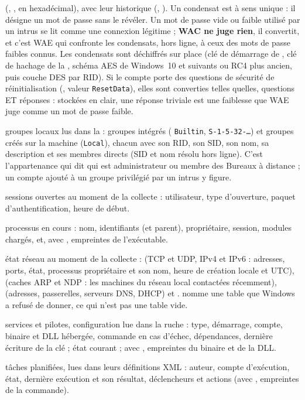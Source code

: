 \documentclass[11pt,a4paper,oneside]{report}
\begin{document}
\begin{description}[style=nextline,leftmargin=1.2em]
        (, , en hexadécimal), avec leur historique
        (, ). Un condensat est à sens
        unique : il désigne un mot de passe sans le révéler. Un mot de passe vide
        ou faible utilisé par un intrus se lit comme une connexion légitime ;
        \textbf{WAC ne juge rien}, il convertit, et c'est WAE qui confronte les
        condensats, hors ligne, à ceux des mots de passe faibles connus. Les
        condensats sont déchiffrés sur place (clé de démarrage de ,
        clé de hachage de la , schéma AES de Windows~10 et suivants
        ou RC4 plus ancien, puis couche DES par RID). Si le compte porte des
        questions de sécurité de réinitialisation (,
        valeur \texttt{ResetData}), elles sont converties telles quelles,
        questions ET réponses : stockées en clair, une réponse triviale est une
        faiblesse que WAE juge comme un mot de passe faible.
  \item[\fichier{local\_groups.json}] groupes locaux lus dans la  :
        groupes intégrés ( \texttt{Builtin}, \texttt{S-1-5-32-…}) et
        groupes créés sur la machine (\texttt{Local}), chacun avec son RID, son
        SID, son nom, sa description et ses membres directs (SID et nom résolu
        hors ligne). C'est l'appartenance qui dit qui est administrateur ou
        membre des Bureaux à distance ; un compte ajouté à un groupe privilégié
        par un intrus y figure.
  \item[\fichier{Sessions.json}] sessions ouvertes au moment de la collecte :
        utilisateur, type d'ouverture, paquet d'authentification, heure de début.
  \item[\fichier{processes.json}] processus en cours : nom, identifiants (et
        parent), propriétaire, session, modules chargés, et, avec ,
        empreintes de l'exécutable.
  \item[\fichier{network.json}] état réseau au moment de la collecte :
         (TCP et UDP, IPv4 et IPv6 : adresses, ports, état,
        processus propriétaire et son nom, heure de création locale et UTC),
         (caches ARP et NDP : les machines du réseau local
        contactées récemment),  (adresses, passerelles,
        serveurs DNS, DHCP) et .  nomme une
        table que Windows a refusé de donner, ce qui n'est pas une table vide.
  \item[\fichier{services.json}] services et pilotes, configuration lue dans la
        ruche : type, démarrage, compte, binaire et DLL hébergée, commande en cas
        d'échec, dépendances, dernière écriture de la clé ; état courant ; avec
        , empreintes du binaire et de la DLL.
  \item[\fichier{ScheduledTasks.json}] tâches planifiées, lues dans leurs
        définitions XML : auteur, compte d'exécution, état, dernière exécution et
        son résultat, déclencheurs et actions (avec , empreintes de la
        commande).
\end{description}
\end{document}

